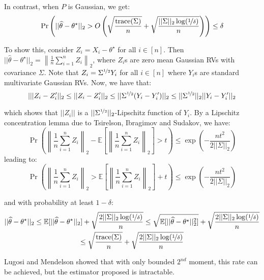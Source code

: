 \documentclass{article}
\theoremstyle{remark}
\theoremstyle{defintiion}
\newcommand{\Exp}{\mathbb{E}}
\newcommand{\trace}{\mathrm{trace}}
\newcommand{\eparam}{\widehat{\theta}}
\newcommand{\tparam}{\theta^{\star}}
\begin{document}
In contrast, when \(P\) is Gaussian, we get:
\begin{equation*}
\Pr\left(||\eparam - \tparam||_{2} > O\left(\sqrt{\frac{\trace(\Sigma)}{n}} + \sqrt{\frac{||\Sigma||_{2}\log(\nicefrac{1}{\delta})}{n}}\right)\right) \leq \delta
\end{equation*}

To show this, consider \(Z_{i} = X_{i} - \tparam\) for all \(i \in [n]\). Then \(||\eparam - \tparam||_{2} = \left\|\frac{1}{n}\sum\limits_{i=1}^{n}Z_{i}\right\|_{2}\), where \(Z_{i}\)s are zero mean Gaussian RVs with covariance \(\Sigma\). Note that \(Z_{i} = \Sigma^{\nicefrac{1}{2}}Y_{i}\) for all \(i \in [n]\) where \(Y_{i}\)s are standard multivariate Gaussian RVs. Now, we have that:
\begin{equation*}
|||Z_{i} - Z'_{i}||_{2} \leq ||Z_{i} - Z'_{i}||_{2} \leq ||\Sigma^{\nicefrac{1}{2}}(Y_{i} - Y'_{i})||_{2} \leq ||\Sigma^{\nicefrac{1}{2}}||_{2}||Y_{i} - Y'_{i}||_{2}
\end{equation*}

which shows that \(||Z_{i}||\) is a \(||\Sigma^{\nicefrac{1}{2}}||_{2}\)-Lipschitz function of \(Y_{i}\). By a Lipschitz concentration lemma due to Tsirelson, Ibragimov and Sudakov, we have:
\begin{equation*}
\Pr\left(\left\|\frac{1}{n} \sum_{i=1}^{n} Z_{i}\right\|_{2} - \Exp\left[\left\|\frac{1}{n} \sum_{i=1}^{n} Z_{i}\right\|_{2}\right] > t\right) \leq \exp\left(-\frac{nt^{2}}{2||\Sigma||_{2}}\right)
\end{equation*}
leading to:
\begin{equation*}
\Pr\left(\left\|\frac{1}{n} \sum_{i=1}^{n} Z_{i}\right\|_{2} > \Exp\left[\left\|\frac{1}{n} \sum_{i=1}^{n} Z_{i}\right\|_{2}\right] + t\right) \leq \exp\left(-\frac{nt^{2}}{2||\Sigma||_{2}}\right)
\end{equation*}

and with probability at least \(1 - \delta\):
\begin{multline*}
||\eparam - \tparam||_{2} \leq \Exp[||\eparam - \tparam||_{2}] + \sqrt{\frac{2||\Sigma||_{2}\log(\nicefrac{1}{\delta})}{n}} \leq \sqrt{\Exp[||\eparam - \tparam||_{2}^{2}]} + \sqrt{\frac{2||\Sigma||_{2}\log(\nicefrac{1}{\delta})}{n}} \\\leq \sqrt{\frac{\trace(\Sigma)}{n}} + \sqrt{\frac{2||\Sigma||_{2}\log(\nicefrac{1}{\delta})}{n}}
\end{multline*}

Lugosi and Mendelson showed that with only bounded \(2^{nd}\) moment, this rate can be achieved, but the estimator proposed is intractable.
\end{document}
